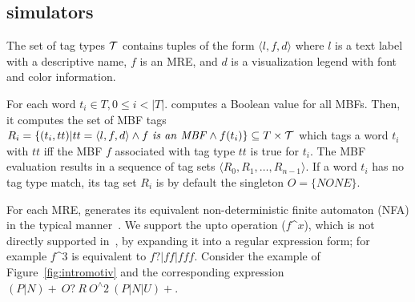 \subsection{\framework simulators}

The set of tag types ${\cal T}$ contains tuples of the form $\langle l,f,d\rangle$ 
where $l$ is a text label with a descriptive name, 
$f$ is an MRE, and $d$ is a visualization legend 
with font and color information.

For each word $t_i\in T, 0\le i < |T|$.
\framework computes a Boolean value 
for all MBFs. 
Then, it computes the set of MBF tags
$R_i=\{(t_i,tt)| tt=\langle l,f,d\rangle \wedge
f~\mathit{is~an~MBF} \wedge f(t_i)\} \subseteq T \times {\cal T}$
which tags a word $t_i$ with $\mathit{tt}$ 
iff the MBF $f$ associated with
tag type $\mathit{tt}$ is true for $t_i$. 
The MBF evaluation results in a sequence of tag sets 
$\langle R_0, R_1, \ldots, R_{n-1}\rangle$.
If a word $t_i$ has no tag type match, 
its tag set $R_i$ is by default the singleton $O=\{\mathit{NONE}\}$.


For each MRE, 
\framework generates its equivalent non-deterministic finite automaton (NFA) in the typical manner~\cite{sipser2006introduction}.
We support the upto operation ($f$\^{}$x$), which is not directly 
supported in~\cite{sipser2006introduction}, by 
expanding it into a regular expression form; for example 
$f$\^{}$3$ is equivalent to $f?|ff|fff$. 
Consider the example of Figure~\ref{fig:intromotiv} and the
corresponding expression $(P|N)\!+~O?~R~O^\wedge 2~(P|N|U)+$. 

